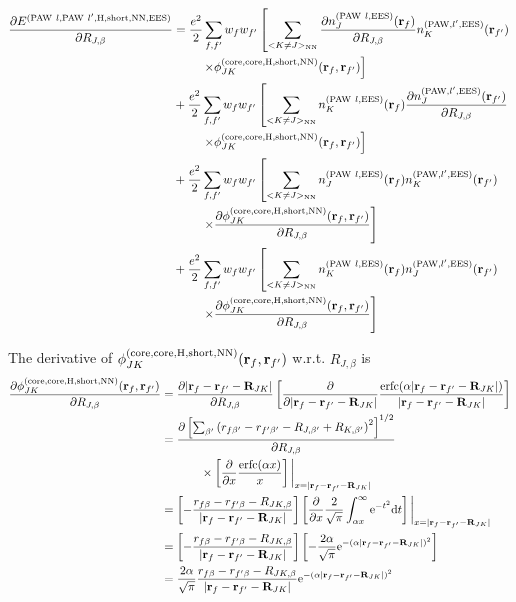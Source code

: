 \documentclass[paper=a4, fontsize=11pt]{article} %
\numberwithin{equation}{section} %
\numberwithin{figure}{section} %
\numberwithin{table}{section} %
\newcommand{\p}{\partial}
\newcommand{\br}{{\bf{r}}}
\newcommand{\bR}{{\bf{R}}}
\newcommand{\rEES}{{\mathrm{EES}}}
\newcommand{\rcore}{{\mathrm{core}}}
\newcommand{\rNN}{{\mathrm{NN}}}
\newcommand{\re}{{\mathrm{e}}}
\newcommand{\rshort}{{\mathrm{short}}}
\newcommand{\rerfc}{{\mathrm{erfc}}}
\newcommand{\rP}{{\mathrm{PAW}}}
\newcommand{\rd}{{\mathrm{d}}}
\newcommand{\rH}{{\mathrm{H}}}
\newcommand{\al}{{\alpha}}
\newcommand{\RJb}{{R_{J,\beta}}}
\begin{document}
\begin{equation}
\begin{split}
\frac{\p E^{(\rP\ l,\rP\ l',\rH,\rshort,\rNN,\rEES)}}{\p \RJb}
&= \frac{e^2}{2}\sum_{f,f'} w_f w_{f'} \left[ \sum_{<K \neq J>_\rNN}\frac{\p n_{J}^{(\rP\ l,\rEES)}(\br_f)}{\p \RJb} n_K^{(\rP,l',\rEES)}(\br_{f'}) \right.\\ 
&\left.\ \ \ \ \ \ \ \times \phi_{JK}^{(\rcore,\rcore,\rH,\rshort,\rNN)}(\br_f,\br_{f'})\right]\\
&+ \frac{e^2}{2}\sum_{f,f'} w_f w_{f'} \left[ \sum_{<K \neq J>_\rNN}n_{K}^{(\rP\ l,\rEES)}(\br_f)\frac{\p n_J^{(\rP,l',\rEES)}(\br_{f'})}{\p \RJb}  \right.\\ 
&\left.\ \ \ \ \ \ \ \times \phi_{JK}^{(\rcore,\rcore,\rH,\rshort,\rNN)}(\br_f,\br_{f'})\right]\\
&+ \frac{e^2}{2}\sum_{f,f'} w_f w_{f'} \left[ \sum_{<K \neq J>_\rNN}n_{J}^{(\rP\ l,\rEES)}(\br_f) n_K^{(\rP,l',\rEES)}(\br_{f'}) \right.\\ 
&\left.\ \ \ \ \ \ \ \times \frac{\p \phi_{JK}^{(\rcore,\rcore,\rH,\rshort,\rNN)}(\br_f,\br_{f'})}{\p \RJb}\right] \\
&+ \frac{e^2}{2}\sum_{f,f'} w_f w_{f'} \left[ \sum_{<K \neq J>_\rNN}n_{K}^{(\rP\ l,\rEES)}(\br_f) n_J^{(\rP,l',\rEES)}(\br_{f'}) \right.\\ 
&\left.\ \ \ \ \ \ \ \times \frac{\p \phi_{JK}^{(\rcore,\rcore,\rH,\rshort,\rNN)}(\br_f,\br_{f'})}{\p \RJb}\right] \\
\end{split}
\end{equation}


The derivative of $\phi_{JK}^{(\rcore,\rcore,\rH,\rshort,\rNN)}(\br_f,\br_{f'})$ w.r.t. $\RJb$ is
\begin{equation}\label{eq:dphishortHNNdR}
\begin{split}
\frac{\p \phi_{JK}^{(\rcore,\rcore,\rH,\rshort,\rNN)}(\br_f,\br_{f'})}{\p \RJb}
&=\frac{\p |\br_f-\br_{f'}-\bR_{JK}|}{\p \RJb} \left[\frac{\p} {\p |\br_f-\br_{f'}-\bR_{JK}|} \frac{\rerfc(\alpha|\br_f-\br_{f'}-\bR_{JK}|)}{|\br_f-\br_{f'}-\bR_{JK}|}\right]\\
&= \frac{\p \left[ \sum_{\beta'} \left(r_{f\beta'}-r_{f'\beta'}-R_{J,\beta'}+R_{K,\beta'}\right)^2\right]^{1/2}}{\p \RJb}\\
&\ \ \ \ \ \ \ \ \ \ \times \left[\frac{\p} {\p x} \frac{\rerfc(\alpha x)}{x}\right]\bigg|_{x=|\br_f-\br_{f'}-\bR_{JK}|}\\
&= \left[-\frac{r_{f\beta}-r_{f'\beta}-R_{JK,\beta}}{|\br_f-\br_{f'}-\bR_{JK}|}\right]\left[\frac{\p}{\p x} \frac{2}{\sqrt{\pi}}\int_{\al x}^{\infty} \re^{-t^2} \rd t\right]\bigg|_{x=|\br_f-\br_{f'}-\bR_{JK}|}\\
&= \left[-\frac{r_{f\beta}-r_{f'\beta}-R_{JK,\beta}}{|\br_f-\br_{f'}-\bR_{JK}|}\right]\left[-\frac{2\al}{\sqrt{\pi}}\re^{-(\alpha|\br_f-\br_{f'}-\bR_{JK}|)^2}\right]\\
&= \frac{2\al}{\sqrt{\pi}} \frac{r_{f\beta}-r_{f'\beta}-R_{JK,\beta}}{|\br_f-\br_{f'}-\bR_{JK}|}\re^{-(\alpha|\br_f-\br_{f'}-\bR_{JK}|)^2}\\
\end{split}
\end{equation}
\end{document}
